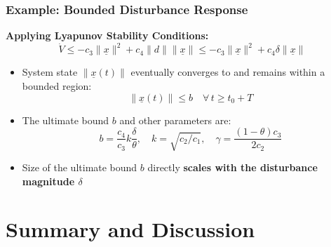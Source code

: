 \documentclass[student, noshadow, lsr, english, aspectratio=169, t]{ITR_LSR_slides}
\begin{document}
\begin{frame}
    \frametitle{Example: Bounded Disturbance Response}

    \textbf{Applying Lyapunov Stability Conditions:}
		\[ \dot{V} \leq -c_3 \|\underline{x}\|^2 + c_4 \|d\| \|\underline{x}\| \leq -c_3 \|\underline{x}\|^2 + c_4 \delta \|\underline{x}\| \]


    \vspace{-0.1cm}
    \begin{tcolorbox}[title=Conclusion: Ultimate Boundedness Guaranteed]
        \begin{itemize}
            \item System state $\|\underline{x}(t)\|$ eventually converges to and remains within a bounded region:
                  \[ \|\underline{x}(t)\| \leq b \quad \forall\, t \geq t_0 + T \]
            \item The ultimate bound $b$ and other parameters are:
                  \[ b = \frac{c_4}{c_3} k \frac{\delta}{\theta}, \quad k = \sqrt{c_2/c_1}, \quad \gamma = \frac{(1 - \theta)c_3}{2c_2} \]
            \item Size of the ultimate bound $b$ directly \textbf{scales with the disturbance magnitude $\delta$}
        \end{itemize}
    \end{tcolorbox}
\end{frame}


\section{Summary and Discussion}
\end{document}
